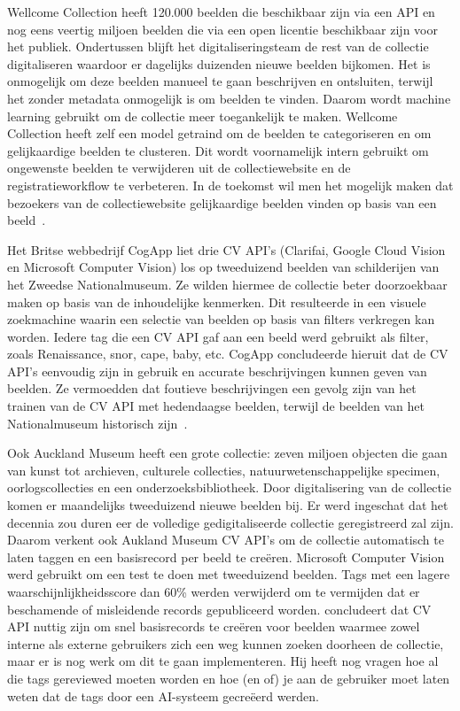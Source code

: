 Wellcome Collection heeft 120.000 beelden die beschikbaar zijn via een API en nog eens veertig miljoen beelden die via een open licentie beschikbaar zijn voor het publiek. Ondertussen blijft het digitaliseringsteam de rest van de collectie digitaliseren waardoor er dagelijks duizenden nieuwe beelden bijkomen. Het is onmogelijk om deze beelden manueel te gaan beschrijven en ontsluiten, terwijl het zonder metadata onmogelijk is om beelden te vinden. Daarom wordt machine learning gebruikt om de collectie meer toegankelijk te maken. Wellcome Collection heeft zelf een model getraind om de beelden te categoriseren en om gelijkaardige beelden te clusteren. Dit wordt voornamelijk intern gebruikt om ongewenste beelden te verwijderen uit de collectiewebsite en de registratieworkflow te verbeteren. In de toekomst wil men het mogelijk maken dat bezoekers van de collectiewebsite gelijkaardige beelden vinden op basis van een beeld~\autocite{Pim2018a}.

Het Britse webbedrijf CogApp liet drie CV API’s (Clarifai, Google Cloud Vision en Microsoft Computer Vision) los op tweeduizend beelden van schilderijen van het Zweedse Nationalmuseum. Ze wilden hiermee de collectie beter doorzoekbaar maken op basis van de inhoudelijke kenmerken. Dit resulteerde in een visuele zoekmachine waarin een selectie van beelden op basis van filters verkregen kan worden. Iedere tag die een CV API gaf aan een beeld werd gebruikt als filter, zoals Renaissance, snor, cape, baby, etc. CogApp concludeerde hieruit dat de CV API’s eenvoudig zijn in gebruik en accurate beschrijvingen kunnen geven van beelden. Ze vermoedden dat foutieve beschrijvingen een gevolg zijn van het trainen van de CV API met hedendaagse beelden, terwijl de beelden van het Nationalmuseum historisch zijn~\autocite{Hindle2017}.

Ook Auckland Museum heeft een grote collectie: zeven miljoen objecten die gaan van kunst tot archieven, culturele collecties, natuurwetenschappelijke specimen, oorlogscollecties en een onderzoeksbibliotheek. Door digitalisering van de collectie komen er maandelijks tweeduizend nieuwe beelden bij. Er werd ingeschat dat het decennia zou duren eer de volledige gedigitaliseerde collectie geregistreerd zal zijn. Daarom verkent ook Aukland Museum CV API’s om de collectie automatisch te laten taggen en een basisrecord per beeld te creëren. Microsoft Computer Vision werd gebruikt om een test te doen met  tweeduizend beelden. Tags met een lagere waarschijnlijkheidsscore dan 60\% werden verwijderd om te vermijden dat er beschamende of misleidende records gepubliceerd worden. \textcite{Moriarty2018a} concludeert dat CV API nuttig zijn om snel basisrecords te creëren voor beelden waarmee zowel interne als externe gebruikers zich een weg kunnen zoeken doorheen de collectie, maar er is nog werk om dit te gaan implementeren. Hij heeft nog vragen hoe al die tags gereviewed moeten worden en hoe (en of) je aan de gebruiker moet laten weten dat de tags door een AI-systeem gecre\"{e}erd werden.   

